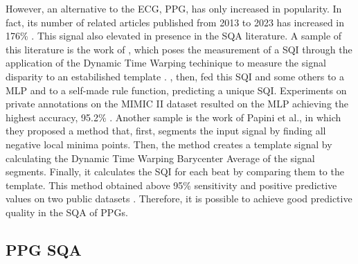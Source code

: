 However, an alternative to the \gls{ECG}, \gls{PPG}, has only increased in popularity. In fact, its number of related articles published from 2013 to 2023 has increased in 176\% \cite{ppg-1}. This signal also elevated in presence in the \gls{SQA} literature. A sample of this literature is the work of \citeauthor{ppg-2}, which poses the measurement of a \gls{SQI} through the application of the Dynamic Time Warping techinique to measure the signal disparity to an estabilished template \cite{ppg-2}. \citeauthor{ppg-2}, then, fed this \gls{SQI} and some others to a \gls{MLP} and to a self-made rule function, predicting a unique \gls{SQI}. Experiments on private annotations on the MIMIC II dataset resulted on the \gls{MLP} achieving the highest accuracy, 95.2\% \cite{ppg-2}. Another sample is the work of Papini et al., in which they proposed a method that, first, segments the input signal by finding all negative local minima points. Then, the method creates a template signal by calculating the Dynamic Time Warping Barycenter Average of the signal segments. Finally, it calculates the \gls{SQI} for each beat by comparing them to the template. This method obtained above 95\% sensitivity and positive predictive values on two public datasets \cite{ppg-3}. Therefore, it is possible to achieve good predictive quality in the \gls{SQA} of \gls{PPG}s.      
	
\subsection{PPG SQA}
		
